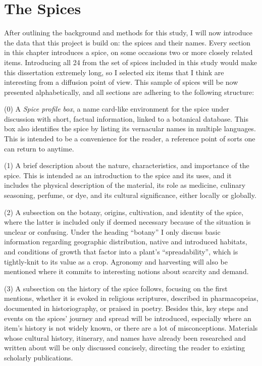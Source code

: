 \chapter{The Spices}
\label{ch:data}

After outlining the background and methods for this study, I will now introduce the data that this project is build on: the spices and their names. Every section in this chapter introduces a spice, on some occasions two or more closely related items. Introducing all 24 from the set of spices included in this study would make this dissertation extremely long, so I selected six items that I think are interesting from a diffusion point of view. This sample of spices will be now presented alphabetically, and all sections are adhering to the following structure:

(0) A \textit{Spice profile box}, a name card-like environment for the spice under discussion with short, factual information, linked to a botanical database. This box also identifies the spice by listing its vernacular names in multiple languages. This is intended to be a convenience for the reader, a reference point of sorts one can return to anytime.

(1) A brief description about the nature, characteristics, and importance of the spice. This is intended as an introduction to the spice and its uses, and it includes the physical description of the material, its role as medicine, culinary seasoning, perfume, or dye, and its cultural significance, either locally or globally. 

(2) A subsection on the botany, origins, cultivation, and identity of the spice, where the latter is included only if deemed necessary because of the situation is unclear or confusing. Under the heading ``botany'' I only discuss basic information regarding geographic distribution, native and introduced habitats, and conditions of growth that factor into a plant's ``spreadability'', which is tightly-knit to its value as a crop. Agronomy and harvesting will also be mentioned where it commits to interesting notions about scarcity and demand.

(3) A subsection on the history of the spice follows, focusing on the first mentions, whether it is evoked in religious scriptures, described in pharmacopeias, documented in historiography, or praised in poetry. Besides this, key steps and events on the spices' journey and spread will be introduced, especially where an item's history is not widely known, or there are a lot of misconceptions. Materials whose cultural history, itinerary, and names have already been researched and written about will be only discussed concisely, directing the reader to existing scholarly publications. 

